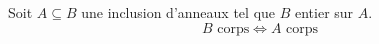 %
%	
%	
%	
%	
%	
%	
%	
%	
%	
%	
%	
%	
\begin{maproposition}
	Soit $A \subseteq B$ une inclusion d'anneaux tel que $B$ entier sur $A$.
	\[ B \text{ corps} \Longleftrightarrow  A \text{ corps} \]
\end{maproposition}
